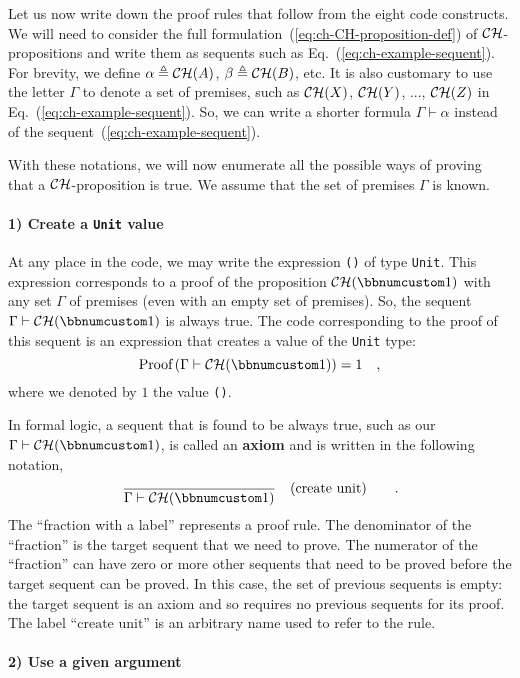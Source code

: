 Let us now write down the proof rules that follow from the eight code
constructs. We will need to consider the full formulation~(\ref{eq:ch-CH-proposition-def})
of ${\cal CH}$-propositions and write them as sequents such as Eq.~(\ref{eq:ch-example-sequent}).
For brevity, we define $\alpha\triangleq{\cal CH}(A)$, $\beta\triangleq{\cal CH}(B)$,
etc. It is also customary to use the letter $\Gamma$ to denote a
set of premises, such as ${\cal CH}(X)$, ${\cal CH}(Y)$, ..., ${\cal CH}(Z)$
in Eq.~(\ref{eq:ch-example-sequent}). So, we can write a shorter
formula $\Gamma\vdash\alpha$ instead of the sequent~(\ref{eq:ch-example-sequent}).

With these notations, we will now enumerate all the possible ways
of proving that a ${\cal CH}$-proposition is true. We assume that
the set of premises $\Gamma$ is known.

\paragraph{1) Create a \lstinline!Unit! value}

At any place in the code, we may write the expression \lstinline!()!
of type \lstinline!Unit!. This expression corresponds to a proof
of the proposition ${\cal CH}(\bbnum 1)$ with any set $\Gamma$ of
premises (even with an empty set of premises). So, the sequent $\Gamma\vdash{\cal CH}(\bbnum 1)$
is always true. The code corresponding to the proof of this sequent
is an expression that creates a value of the \lstinline!Unit! type:
\[
\text{Proof}\left(\Gamma\vdash{\cal CH}(\bbnum 1)\right)=1\quad,
\]
where we denoted by $1$ the value \lstinline!()!.

In formal logic, a sequent that is found to be always true, such as
our $\Gamma\vdash{\cal CH}(\bbnum 1)$, is called an \textbf{axiom}
and is written in the following notation,
\[
\frac{}{\Gamma\vdash{\cal CH}(\bbnum 1)}\quad(\text{create unit})\quad\quad.
\]
The ``fraction with a label'' represents a proof rule. The denominator
of the ``fraction'' is the target sequent that we need to prove.
The numerator of the ``fraction'' can have zero or more other sequents
that need to be proved before the target sequent can be proved. In
this case, the set of previous sequents is empty: the target sequent
is an axiom and so requires no previous sequents for its proof. The
label ``$\text{create unit}$'' is an arbitrary name used to refer
to the rule.

\paragraph{2) Use a given argument}

